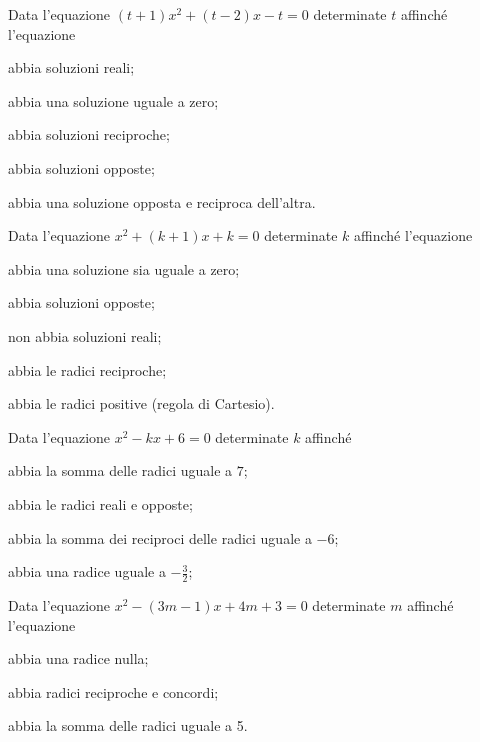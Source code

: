 \begin{esercizio}[\Ast] %
 \label{ese:3.106}
Data l'equazione $(t+1)x^{2} + (t - 2) x -t = 0$ determinate $t$ affinché l'equazione
\begin{multicols}{2}
\begin{enumeratea}
\item abbia soluzioni reali;
\item abbia una soluzione uguale a zero;
\item abbia soluzioni reciproche;
\item abbia soluzioni opposte;
\item abbia una soluzione opposta e reciproca dell'altra.
\end{enumeratea}
\end{multicols}
\end{esercizio}

\begin{esercizio}[\Ast]
 \label{ese:3.107}
Data l'equazione $x^{2} + (k + 1) x + k = 0$ determinate $k$ affinché l'equazione
\begin{enumeratea}
\item abbia una soluzione sia uguale a zero;
\item abbia soluzioni opposte;
\item non abbia soluzioni reali;
\item abbia le radici reciproche;
\item abbia le radici positive (regola di Cartesio).
\end{enumeratea}
\end{esercizio}

\begin{esercizio}[\Ast]
 \label{ese:3.108}
Data l'equazione $x^{2}-kx + 6 = 0$ determinate $k$ affinché
\begin{enumeratea}
\item abbia la somma delle radici uguale a $7$;
\item abbia le radici reali e opposte;
\item abbia la somma dei reciproci delle radici uguale a $-6$;
\item abbia una radice uguale a $- \frac{3}{2}$;
\end{enumeratea}
\end{esercizio}

\begin{esercizio}[\Ast] %
 \label{ese:3.109}
Data l'equazione $x^{2} - (3m - 1) x +4m+3 = 0$ determinate $m$ affinché l'equazione
\begin{enumeratea}
\item abbia una radice nulla;
\item abbia radici reciproche e concordi;
\item abbia la somma delle radici uguale a 5.
\end{enumeratea}
\end{esercizio}

